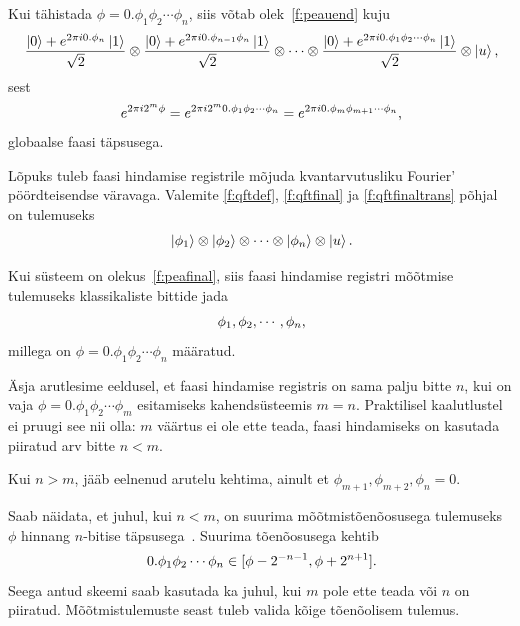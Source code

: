 \documentclass[12pt]{report}
\def\ket#1{\mathinner{|#1\rangle}}
\begin{document}
Kui tähistada \(\phi=0.\phi_1\phi_2\cdots\phi_n\), siis võtab olek~\ref{f:peauend} kuju
\begin{align}
    \frac{\ket{0}+ e^{2\pi i0.\phi_n}\ket{1}}{\sqrt{2}}
    \otimes \frac{\ket{0}+ e^{2\pi i0.\phi_{n-1}\phi_n}\ket{1}}{\sqrt{2}}
    \otimes\cdots
    \otimes \frac{\ket{0}+ e^{2\pi i0.\phi_1\phi_2\cdots\phi_n}\ket{1}}{\sqrt{2}}
    \otimes\ket{u} \rlap{,}
\end{align}
sest
\begin{align}
    e^{2\pi i2^m\phi}
    = e^{2\pi i2^m 0.\phi_1\phi_2\cdots\phi_n}
    = e^{2\pi i0.\phi_m\phi_{m+1}\cdots\phi_n} \rlap{,}
\end{align}
globaalse faasi täpsusega.

Lõpuks tuleb faasi hindamise registrile mõjuda kvantarvutusliku Fourier' pöördteisendse väravaga.
Valemite \ref{f:qftdef}, \ref{f:qftfinal} ja \ref{f:qftfinaltrans} põhjal on tulemuseks
\begin{align}\label{f:peafinal}
    \ket{\phi_1} \otimes \ket{\phi_2} \otimes \cdots \otimes \ket{\phi_n} \otimes \ket{u} \rlap{.}
\end{align}

Kui süsteem on olekus~\ref{f:peafinal}, siis faasi hindamise registri mõõtmise tulemuseks klassikaliste bittide jada
\begin{align}
    \phi_1, \phi_2, \cdots, \phi_n \rlap{,}
\end{align}
millega on \(\phi = 0.\phi_1\phi_2 \cdots \phi_n\) määratud.

Äsja arutlesime eeldusel, et faasi hindamise registris on sama palju bitte \(n\), kui on vaja \(\phi = 0.\phi_1\phi_2 \cdots \phi_m\) esitamiseks kahendsüsteemis \(m = n\).
Praktilisel kaalutlustel ei pruugi see nii olla: \(m\) väärtus ei ole ette teada, faasi hindamiseks on kasutada piiratud arv bitte \(n < m\).

Kui \(n > m\), jääb eelnenud arutelu kehtima, ainult et \(\phi_{m+1}, \phi_{m+2}, \phi_n = 0\).

Saab näidata, et juhul, kui \(n < m\), on suurima mõõtmistõenõosusega tulemuseks \(\phi\) hinnang \(n\)-bitise täpsusega~\cite{kaye+laflamme+mosca}.
Suurima tõenõosusega kehtib
\begin{equation}
    0.\phi_1\phi_2\cdots\phi_n \in [\phi - 2^{-n-1}, \phi + 2^{n+1}] \rlap{.}
\end{equation}
Seega antud skeemi saab kasutada ka juhul, kui \(m\) pole ette teada või \(n\) on piiratud.
Mõõtmis\-tulemuste seast tuleb valida kõige tõenõolisem tulemus.
\end{document}
